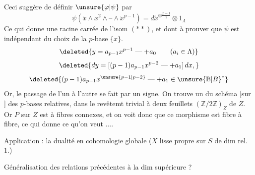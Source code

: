 Ceci suggère  de définir $\unsure{\varphi|\psi}$ par
\[
 \boxed{\psi(\dot x\wedge\dot x^2\wedge\text{--}\wedge\dot x^{p-1})
 =d\widetilde x^{\otimes\frac{p-1}{2}}\otimes 1_\Lambda}
 \tag*{($\ast\ast\ast$)}
\]
Ce qui donne une racine carrée de l'isom $(\ast\ast)$, et dont  à prouver que $\psi$ est indépendant du choix de la $p$-base $\{x\}$. 
\[
 \deleted{y=a_{p-1}x^{p-1}\mathrel{\text{---}}+a_0\qquad(a_i\in\Lambda)}
\]
\[
 \deleted{dy=[(p-1)a_{p-1}x^{p-2}\mathrel{\text{---}}+a_1]\,dx,}
\]
\[
 \deleted{(p-1)a_{p-1}x^{\unsure{p-1|p-2}}\mathrel{\text{---}}+a_1\in{\unsure{\mathbb B|B}}^\ast}
\]
Or, le passage de l'un à l'autre se fait par un signe. On trouve un   du schéma  [sur \deleted{\unsure{$\Lambda$}} ] des $p$-bases relatives, dans le revêtemt trivial à deux feuillets $(\mathbb Z/2\mathbb Z)_Z$ de $Z$.  Or  $P$ sur $Z$ est à fibres connexes, et on voit donc que  ce morphisme est  fibre à fibre, ce qui donne ce qu'on veut $\ldots$.

Application : la dualité en cohomologie globale ($X$ lisse propre sur $S$ de dim rel. 1.)

 Généralisation des relations précédentes à la dim supérieure ?
